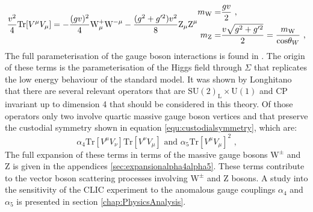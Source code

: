 %
\begin{equation}
\frac{v^{2}}{4}\text{Tr}[V^{\mu}V_{\mu}] = - \frac{(gv)^{2}}{4} \text{W}^{+}_{\mu} \text{W}^{-\mu} - \frac{(g^{2} + g'^{2})v^{2}}{8} \text{Z}_{\mu} \text{Z}^{\mu} \\
\begin{aligned}
m_{\text{W}} = & \frac{gv}{2} \text{ ,} \\
m_{\text{Z}} = & \frac{v\sqrt{g^{2} + g'^{2}}}{2} = \frac{m_{\text{W}}}{\text{cos}{\theta_{W}}} \text{ ,}
\end{aligned}
\end{equation}
%
\noindent The full parameterisation of the gauge boson interactions is found in \cite{Herrero:1994tj}.  The origin of these terms is the parameterisation of the Higgs field through $\Sigma$ that replicates the low energy behaviour of the standard model.  It was shown by Longhitano \cite{Longhitano:1980tm} that there are several relevant operators that are $\text{SU}(2)_{\text{L}} \times \text{U}(1)$ and CP invariant up to dimension 4 that should be considered in this theory.  Of those operators only two involve quartic massive gauge boson vertices and that preserve the custodial symmetry \cite{Belyaev:354051} shown in equation \ref{equ:custodialsymmetry}, which are:
%
\begin{equation}
\alpha_{4}\text{Tr}[V^{\mu}V_{\nu}]\text{Tr}[V^{\nu}V_{\mu}] \text{ and } \alpha_{5}\text{Tr}[V^{\mu}V_{\mu}]^{2} \text{ ,}
\end{equation}
%
\noindent The full expansion of these terms in terms of the massive gauge bosons $\text{W}^{\pm}$ and Z is given in the appendices \ref{sec:expansionalpha4alpha5}.  These terms contribute to the vector boson scattering processes involving $\text{W}^{\pm}$ and Z bosons.  A study into the sensitivity of the CLIC experiment to the anomalous gauge couplings $\alpha_{4}$ and $\alpha_{5}$ is presented in section \ref{chap:PhysicsAnalysis}.



